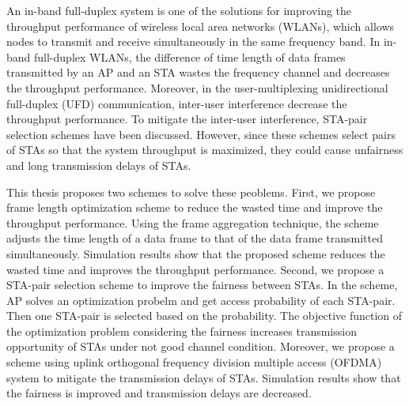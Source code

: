 \documentclass[master]{kuisthesis}		%
\begin{document}
\begin{eabstract}				%
	An in-band full-duplex system is one of the solutions for improving the throughput performance of wireless local area networks (WLANs), which allows nodes to transmit and receive simultaneously in the same frequency band. In in-band full-duplex WLANs, the difference of time length of data frames transmitted by an AP and an STA wastes the frequency channel and decreases the throughput performance. Moreover, in the user-multiplexing unidirectional full-duplex (UFD) communication, inter-user interference decrease the throughput performance. To mitigate the inter-user interference, STA-pair selection schemes have been discussed.
	However, since these schemes select pairs of STAs so that the system throughput is maximized, they could cause unfairness and long transmission delays of STAs.
	\par
	This thesis proposes two schemes to solve these peoblems. First, we propose frame length optimization scheme to reduce the wasted time and improve the throughput performance. Using the frame aggregation technique, the scheme adjusts the time length of a data frame to that of the data frame transmitted simultaneously. Simulation results show that the proposed scheme reduces the wasted time and improves the throughput performance. Second, we propose a STA-pair selection scheme to improve the fairness between STAs. In the scheme, AP solves an optimization probelm and get access probability of each STA-pair. Then one STA-pair is selected based on the probability. The objective function of the optimization problem considering the fairness increases transmission opportunity of STAs under not good channel condition. Moreover, we propose a scheme using uplink orthogonal frequency division multiple access (OFDMA) system to mitigate the transmission delays of STAs. Simulation results show that the fairness is improved and transmission delays are decreased.\\
\end{eabstract}

\tableofcontents				%

\end{document}
